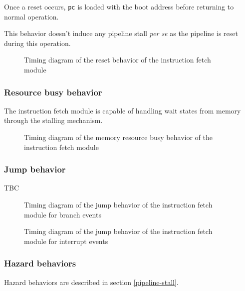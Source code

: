 \begin{content}
  Once a reset occurs, \texttt{pc} is loaded with the boot address before returning to normal operation.

  This behavior doesn't induce any pipeline stall \textit{per se} as the pipeline is reset during this operation.
\end{content}

\begin{figure}[H]
    \centering
    
    \caption{Timing diagram of the reset behavior of the instruction fetch module}
    \label{fig:ifm-behavior-reset}
\end{figure}

\subsubsection{Resource busy behavior}

\begin{content}
  The instruction fetch module is capable of handling wait states from memory through the stalling mechanism.
\end{content}

\begin{figure}[H]
    \centering
    
    \caption{Timing diagram of the memory resource busy behavior of the instruction fetch module}
    \label{fig:ifm-behavior-wait}
\end{figure}

\subsubsection{Jump behavior}

\begin{content}
  TBC
\end{content}

\begin{figure}[H]
    \centering
    
    \caption{Timing diagram of the jump behavior of the instruction fetch module for branch events}
    \label{fig:ifm-behavior-branch}
\end{figure}

\begin{figure}[H]
    \centering
    
    \caption{Timing diagram of the jump behavior of the instruction fetch module for interrupt events}
    \label{fig:ifm-behavior-interrupt}
\end{figure}

\subsubsection{Hazard behaviors}

\begin{content}
  Hazard behaviors are described in section \ref{pipeline-stall}.
\end{content}

\newpage
